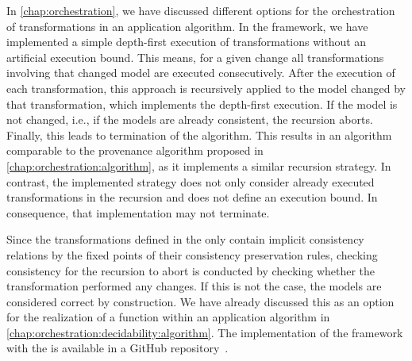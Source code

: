 In \autoref{chap:orchestration}, we have discussed different options for the orchestration of transformations in an application algorithm.
In the \vitruv framework, we have implemented a simple depth-first execution of transformations without an artificial execution bound.
This means, for a given change all transformations involving that changed model are executed consecutively.
After the execution of each transformation, this approach is recursively applied to the model changed by that transformation, which implements the depth-first execution.
If the model is not changed, i.e., if the models are already consistent, the recursion aborts.
Finally, this leads to termination of the algorithm.
This results in an algorithm comparable to the provenance algorithm proposed in \autoref{chap:orchestration:algorithm}, as it implements a similar recursion strategy.
In contrast, the implemented strategy does not only consider already executed transformations in the recursion and does not define an execution bound.
In consequence, that implementation may not terminate.

Since the transformations defined in the \reactionslanguage only contain implicit consistency relations by the fixed points of their consistency preservation rules, checking consistency for the recursion to abort is conducted by checking whether the transformation performed any changes.
If this is not the case, the models are considered correct by construction.
We have already discussed this as an option for the realization of a  function within an application algorithm in \autoref{chap:orchestration:decidability:algorithm}.
The implementation of the framework with the \reactionslanguage is available in a GitHub repository~\cite{vitruvFrameworkGithub}.






